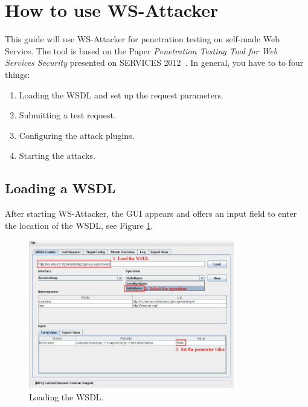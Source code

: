 \section{How to use WS-Attacker}
\label{sec:how_to_use_ws_attacker}

This guide will use WS-Attacker for penetration testing on self-made Web Service.
The tool is based on the Paper \emph{Penetration Testing Tool for Web Services Security} presented on SERVICES 2012~\cite{MaSoSchPTT2012}.
In general, you have to to four things:

\begin{enumerate}
    \item Loading the WSDL and set up the request parameters.
    \item Submitting a test request.
    \item Configuring the attack plugins.
    \item Starting the attacks.
\end{enumerate}

\subsection{Loading a WSDL}
\label{sec:loading_a_wsdl}

After starting WS-Attacker, the GUI appears and offers an input field to enter the location
of the WSDL, see Figure \ref{fig:load_wsdl}.

\begin{figure}[h!]
    \begin{center}
        \includegraphics[width=0.8\textwidth]{img/load_wsdl}
    \end{center}
    \caption{Loading the WSDL.}
    \label{fig:load_wsdl}
\end{figure}

